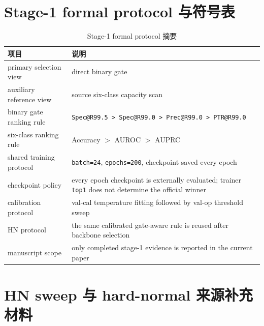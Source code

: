 \documentclass[UTF8,openany,12pt]{ctexbook}
\newcommand{\formalmetric}[1]{\texttt{#1}}
\begin{document}
\appendix

\chapter{Stage-1 formal protocol 与符号表}
\begin{table}[H]
    \centering
    \caption{Stage-1 formal protocol 摘要}
    \label{tab:stage1-capacity-protocol}
    \begin{tabularx}{\textwidth}{>{\raggedright\arraybackslash}p{3.2cm}X}
        \toprule
        项目 & 说明 \\
        \midrule
        primary selection view & direct binary gate \\
        auxiliary reference view & source six-class capacity scan \\
        binary gate ranking rule & \formalmetric{Spec@R99.5 > Spec@R99.0 > Prec@R99.0 > PTR@R99.0} \\
        six-class ranking rule & Accuracy $>$ AUROC $>$ AUPRC \\
        shared training protocol & \texttt{batch=24}, \texttt{epochs=200}, checkpoint saved every epoch \\
        checkpoint policy & every epoch checkpoint is externally evaluated; trainer \formalmetric{top1} does not determine the official winner \\
        calibration protocol & val-cal temperature fitting followed by val-op threshold sweep \\
        HN protocol & the same calibrated gate-aware rule is reused after backbone selection \\
        manuscript scope & only completed stage-1 evidence is reported in the current paper \\
        \bottomrule
    \end{tabularx}
\end{table}

\chapter{HN sweep 与 hard-normal 来源补充材料}
\end{document}

